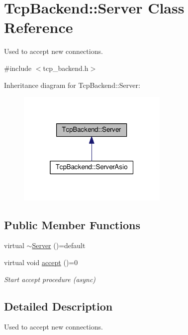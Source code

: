 \hypertarget{classTcpBackend_1_1Server}{}\section{Tcp\+Backend\+:\+:Server Class Reference}
\label{classTcpBackend_1_1Server}


Used to accept new connections.  




{\ttfamily \#include $<$tcp\+\_\+backend.\+h$>$}



Inheritance diagram for Tcp\+Backend\+:\+:Server\+:
\nopagebreak
\begin{figure}[H]
\begin{center}
\leavevmode
\includegraphics[width=205pt]{classTcpBackend_1_1Server__inherit__graph}
\end{center}
\end{figure}
\subsection*{Public Member Functions}
\begin{DoxyCompactItemize}
\item 
virtual \hyperlink{classTcpBackend_1_1Server_a567fe5cf7bc9ed07eec98bc21ba5b294}{$\sim$\+Server} ()=default
\item 
virtual void \hyperlink{classTcpBackend_1_1Server_aab685a052c45a25ecc9a30ec14bf91e9}{accept} ()=0
\begin{DoxyCompactList}\small\item\em Start accept procedure (async) \end{DoxyCompactList}\end{DoxyCompactItemize}


\subsection{Detailed Description}
Used to accept new connections. 

